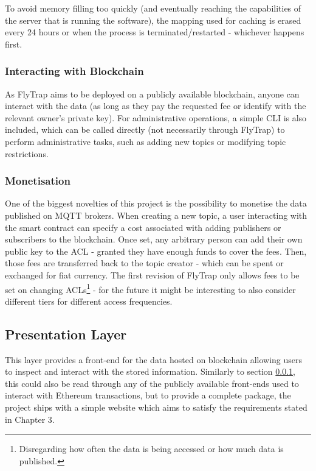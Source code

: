 To avoid memory filling too quickly (and eventually reaching the capabilities of the server that is running the software), the mapping used for caching is erased every 24 hours or when the process is terminated/restarted - whichever happens first.

\subsubsection{Interacting with Blockchain}\label{sec:interact}
As FlyTrap aims to be deployed on a publicly available blockchain, anyone can interact with the data (as long as they pay the requested fee or identify with the relevant owner's private key). For administrative operations, a simple CLI is also included, which can be called directly (not necessarily through FlyTrap) to perform administrative tasks, such as adding new topics or modifying topic restrictions.

\subsubsection{Monetisation}\label{sec:monetization}
One of the biggest novelties of this project is the possibility to monetise the data published on MQTT brokers. When creating a new topic, a user interacting with the smart contract can specify a cost associated with adding publishers or subscribers to the blockchain. Once set, any arbitrary person can add their own public key to the ACL - granted they have enough funds to cover the fees. Then, those fees are transferred back to the topic creator - which can be spent or exchanged for fiat currency. The first revision of FlyTrap only allows fees to be set on changing ACLs\footnote{Disregarding how often the data is being accessed or how much data is published.} - for the future it might be interesting to also consider different tiers for different access frequencies. 

\subsection{Presentation Layer}
This layer provides a front-end for the data hosted on blockchain allowing users to inspect and interact with the stored information. Similarly to section \ref{sec:interact}, this could also be read through any of the publicly available front-ends used to interact with Ethereum transactions, but to provide a complete package, the project ships with a simple website which aims to satisfy the requirements stated in Chapter 3.
